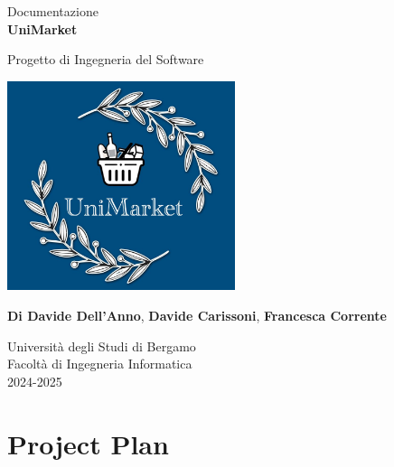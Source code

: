 \documentclass[a4paper,12pt]{article}
\begin{document}
\begin{titlepage}
    \centering
    \vspace*{2cm}
    
    \vspace{1.5cm}
    
    \large Documentazione\\
    \Huge
    \textbf{UniMarket}
    
    \vspace{1.5cm}
    
    \LARGE
    Progetto di Ingegneria del Software
    
    \vspace{1.5cm}
    \includegraphics[width=0.5\textwidth]{../Media/logo.jpeg}
    
    \vspace{1.5cm}
    \small
    \textbf{Di Davide Dell'Anno}, \textbf{Davide Carissoni}, \textbf{Francesca Corrente}
    
    \vspace{1.5cm}
    
    \Large
    Università degli Studi di Bergamo \\
    Facoltà di Ingegneria Informatica \\
    2024-2025
    
\end{titlepage}

\renewcommand{\contentsname}{Indice}
\tableofcontents
\newpage

\section{Project Plan}

\end{document}
